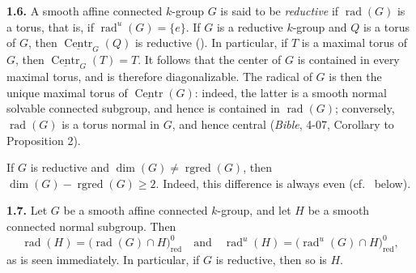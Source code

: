 \par\medskip\noindent{}\textbf{1.6.}\quad
A smooth affine connected \(k\)-group \(G\) is said to be \emph{reductive}
if \(\operatorname{rad}(G)\) is a torus, that is, if
\(\operatorname{rad}^{u}(G)=\{e\}\).  If \(G\) is a reductive \(k\)-group
and \(Q\) is a torus of \(G\), then
\(\underline{\operatorname{Centr}}_{G}(Q)\) is reductive
().  In particular, if \(T\) is a maximal torus of \(G\),
then \(\underline{\operatorname{Centr}}_{G}(T)=T\).  It follows that the
center of \(G\) is contained in every maximal torus, and is therefore
diagonalizable.  The radical of \(G\) is then the unique maximal torus of
\(\underline{\operatorname{Centr}}(G)\): indeed, the latter is a smooth
normal solvable connected subgroup, and hence is contained in
\(\operatorname{rad}(G)\); conversely, \(\operatorname{rad}(G)\) is a torus
normal in \(G\), and hence central (\emph{Bible}, 4-07, Corollary to
Proposition 2).

If \(G\) is reductive and \(\dim(G)\ne\operatorname{rgred}(G)\), then
\(\dim(G)-\operatorname{rgred}(G)\geq 2\).  Indeed, this difference is
always even (cf.\  below).

\par\medskip\noindent{}\textbf{1.7.}\quad
Let \(G\) be a smooth affine connected \(k\)-group, and let \(H\) be a
smooth connected normal subgroup.  Then
\[
  \operatorname{rad}(H)
  =
  \bigl(\operatorname{rad}(G)\cap H\bigr)_{\mathrm{red}}^{0}
  \quad\text{and}\quad
  \operatorname{rad}^{u}(H)
  =
  \bigl(\operatorname{rad}^{u}(G)\cap H\bigr)_{\mathrm{red}}^{0},
\]
as is seen immediately.  In particular, if \(G\) is reductive, then so is
\(H\).


